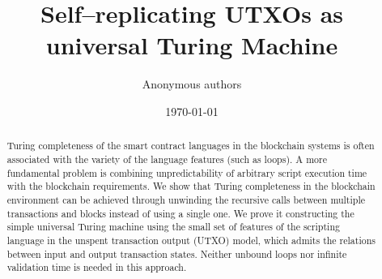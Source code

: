 \documentclass[runningheads]{llncs}
\begin{document}
    \title{Self--replicating UTXOs as universal Turing Machine}

    \author{Anonymous authors}

    \date{\today}
    \maketitle

    \begin{abstract}
        Turing completeness of the smart contract languages in the blockchain
        systems is often associated with the variety of the language features
        (such as loops). %
        A more fundamental problem is combining unpredictability of arbitrary
        script execution time with the blockchain requirements.
        We show that Turing completeness in the blockchain environment can
        be achieved through unwinding the recursive calls between
        multiple transactions and blocks instead of using a single one. We prove
        it constructing the simple universal Turing machine using
        the small set of features of the scripting language in the unspent
        transaction output (UTXO) model, which admits the relations between
        input and output transaction states.
        Neither unbound loops nor infinite validation time is needed in this approach.

    \end{abstract}
\end{document}
